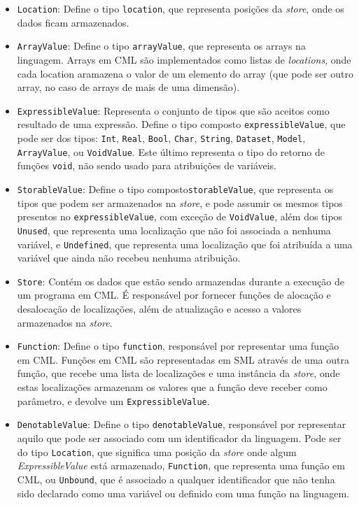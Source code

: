 \documentclass[12pt]{article}
\begin{document}
\begin{itemize}
\item \texttt{Location}: Define o tipo \texttt{location}, que representa posições da \textit{store}, onde os dados ficam armazenados.

\item \texttt{ArrayValue}: Define o tipo \texttt{arrayValue}, que representa os arrays na linguagem. Arrays em CML são implementados como listas de \textit{locations}, onde cada location aramazena o valor de um elemento do array (que pode ser outro array, no caso de arrays de mais de uma dimensão).

\item \texttt{ExpressibleValue}: Representa o conjunto de tipos que são aceitos como resultado de uma expressão. Define o tipo composto \texttt{expressibleValue}, que pode ser dos tipos: \texttt{Int}, \texttt{Real}, \texttt{Bool}, \texttt{Char}, \texttt{String}, \texttt{Dataset}, \texttt{Model}, \texttt{ArrayValue}, ou \texttt{VoidValue}. Este último representa o tipo do retorno de funções \texttt{void}, não sendo usado para atribuições de variáveis.

\item \texttt{StorableValue}: Define o tipo composto\texttt{storableValue}, que representa os tipos que podem ser armazenados na \textit{store}, e pode assumir os mesmos tipos presentos no \texttt{expressibleValue}, com exceção de \texttt{VoidValue}, além dos tipos \texttt{Unused}, que representa uma localização que não foi associada a nenhuma variável, e \texttt{Undefined}, que representa uma localização que foi atribuída a uma variável que ainda não recebeu nenhuma atribuição.

\item \texttt{Store}: Contém os dados que estão sendo armazendas durante a execução de um programa em CML. É responsável por fornecer funções de alocação e desalocação de localizações, além de atualização e acesso a valores armazenados na \textit{store}.

\item \texttt{Function}: Define o tipo \texttt{function}, responsável por representar uma função em CML. Funções em CML são representadas em SML através de uma outra função, que recebe uma lista de localizações e uma instância da \textit{store}, onde estas localizações armazenam os valores que a função deve receber como parâmetro, e devolve um \texttt{ExpressibleValue}.

\item \texttt{DenotableValue}: Define o tipo \texttt{denotableValue}, responsável por representar aquilo que pode ser associado com um identificador da linguagem. Pode ser do tipo \texttt{Location}, que significa uma posição da \textit{store} onde algum  \textit{ExpressibleValue} está armazenado, \texttt{Function}, que representa uma função em CML, ou \texttt{Unbound}, que é associado a qualquer identificador que não tenha sido declarado como uma variável ou definido com uma função na linguagem.


\end{itemize}
\end{document}
